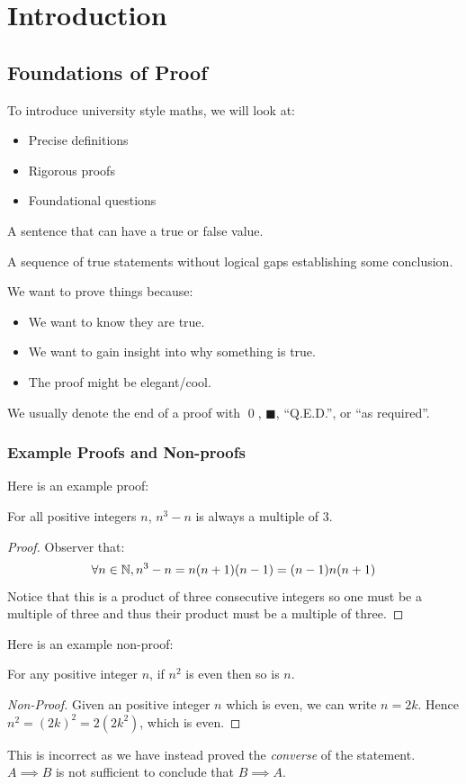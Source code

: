 \documentclass[../main.tex]{subfiles}
\begin{document}
\chapter{Introduction}
\section{Foundations of Proof}
To introduce university style maths, we will look at:
\begin{itemize}
  \item Precise definitions
  \item Rigorous proofs
  \item Foundational questions
\end{itemize}
\begin{definition}
  A sentence that can have a true or false value.
\end{definition}
\begin{definition}[Proof]
  A sequence of true statements without logical gaps establishing some conclusion.
\end{definition}
We want to prove things because:
\begin{itemize}
  \item We want to know they are true.
  \item We want to gain insight into why something is true.
  \item The proof might be elegant/cool.
\end{itemize}
We usually denote the end of a proof with \qed, $\blacksquare$, ``Q.E.D.'', or ``as required''.

\subsection{Example Proofs and Non-proofs}
Here is an example proof:
\begin{proposition}
  For all positive integers $n$, $n^3 - n$ is always a multiple of 3.
\end{proposition}
\begin{proof}
  Observer that:
  \[
    \forall n \in \mathbb{N}, n^3 - n = n(n + 1)(n - 1) = (n - 1)n(n + 1)
  \]
  Notice that this is a product of three consecutive integers so one must be a multiple of three and thus their product must be a multiple of three.
\end{proof}
Here is an example non-proof:
\begin{proposition}
  For any positive integer $n$, if $n^2$ is even then so is $n$.
  \label{nEven}
\end{proposition}
\begin{proof}[Non-Proof]
  Given an positive integer $n$ which is even, we can write $n = 2k$.
  Hence $n^2 = (2k)^2 = 2(2k^2)$, which is even.
\end{proof}
This is incorrect as we have instead proved the \textit{converse} of the statement.
$A \implies B$ is not sufficient to conclude that $B \implies A$.
\end{document}
